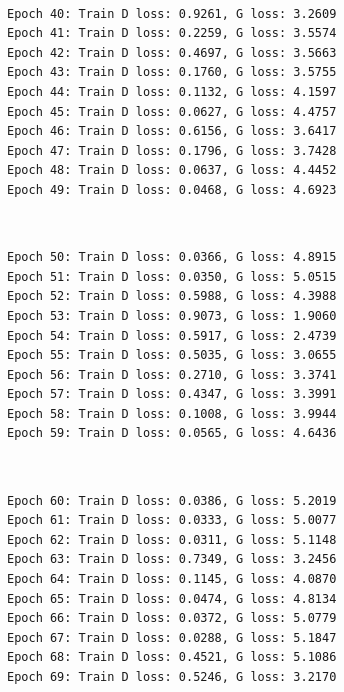 \documentclass[11pt]{article}
\begin{document}
    \begin{center}
    \end{center}
    { \hspace*{\fill} \\}
    
    \begin{Verbatim}[commandchars=\\\{\}]
Epoch 40: Train D loss: 0.9261, G loss: 3.2609
Epoch 41: Train D loss: 0.2259, G loss: 3.5574
Epoch 42: Train D loss: 0.4697, G loss: 3.5663
Epoch 43: Train D loss: 0.1760, G loss: 3.5755
Epoch 44: Train D loss: 0.1132, G loss: 4.1597
Epoch 45: Train D loss: 0.0627, G loss: 4.4757
Epoch 46: Train D loss: 0.6156, G loss: 3.6417
Epoch 47: Train D loss: 0.1796, G loss: 3.7428
Epoch 48: Train D loss: 0.0637, G loss: 4.4452
Epoch 49: Train D loss: 0.0468, G loss: 4.6923

    \end{Verbatim}

    \begin{center}
    \end{center}
    { \hspace*{\fill} \\}
    
    \begin{Verbatim}[commandchars=\\\{\}]
Epoch 50: Train D loss: 0.0366, G loss: 4.8915
Epoch 51: Train D loss: 0.0350, G loss: 5.0515
Epoch 52: Train D loss: 0.5988, G loss: 4.3988
Epoch 53: Train D loss: 0.9073, G loss: 1.9060
Epoch 54: Train D loss: 0.5917, G loss: 2.4739
Epoch 55: Train D loss: 0.5035, G loss: 3.0655
Epoch 56: Train D loss: 0.2710, G loss: 3.3741
Epoch 57: Train D loss: 0.4347, G loss: 3.3991
Epoch 58: Train D loss: 0.1008, G loss: 3.9944
Epoch 59: Train D loss: 0.0565, G loss: 4.6436

    \end{Verbatim}

    \begin{center}
    \end{center}
    { \hspace*{\fill} \\}
    
    \begin{Verbatim}[commandchars=\\\{\}]
Epoch 60: Train D loss: 0.0386, G loss: 5.2019
Epoch 61: Train D loss: 0.0333, G loss: 5.0077
Epoch 62: Train D loss: 0.0311, G loss: 5.1148
Epoch 63: Train D loss: 0.7349, G loss: 3.2456
Epoch 64: Train D loss: 0.1145, G loss: 4.0870
Epoch 65: Train D loss: 0.0474, G loss: 4.8134
Epoch 66: Train D loss: 0.0372, G loss: 5.0779
Epoch 67: Train D loss: 0.0288, G loss: 5.1847
Epoch 68: Train D loss: 0.4521, G loss: 5.1086
Epoch 69: Train D loss: 0.5246, G loss: 3.2170

    \end{Verbatim}
\end{document}
